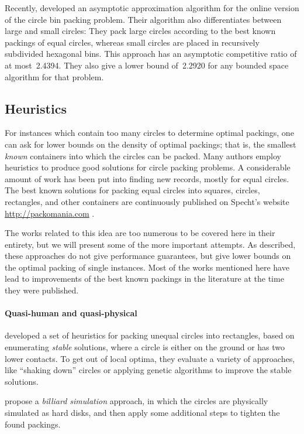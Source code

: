 \documentclass[a4paper,style=print,bibliography=totoc,nexus,lnum,extramargin]{tubsbook}
\begin{document}
Recently, \textcite{HMS2016bounded} developed an asymptotic approximation algorithm for the online version of the circle bin packing problem.
Their algorithm also differentiates between large and small circles: They pack large circles according to the best known packings of equal circles, whereas small circles are placed in recursively subdivided hexagonal bins. This approach has an asymptotic competitive ratio of at most~2.4394. They also give a lower bound of~2.2920 for any bounded space algorithm for that problem.

\subsection{Heuristics}

For instances which contain too many circles to determine optimal packings, one can ask for lower bounds on the density of optimal packings; that is, the smallest \emph{known} containers into which the circles can be packed.
Many authors employ heuristics to produce good solutions for circle packing problems.
A considerable amount of work has been put into finding new records, mostly for equal circles. The best known solutions for packing equal circles into squares, circles, rectangles, and other containers are continuously published on Specht's website \url{http://packomania.com} \cite{specht2015packomania}.

The works related to this idea are too numerous to be covered here in their entirety, but we will present some of the more important attempts. As described, these approaches do not give performance guarantees, but give lower bounds on the optimal packing of single instances. Most of the works mentioned here have lead to improvements of the best known packings in the literature at the time they were published.

\paragraph{Quasi-human and quasi-physical}

\textcite{GGL1995packing} developed a set of heuristics for packing unequal circles into rectangles, based on enumerating \emph{stable} solutions, where a circle is either on the ground or has two lower contacts. To get out of local optima, they evaluate a variety of approaches, like “shaking down” circles or applying genetic algorithms to improve the stable solutions.

\textcite{GLNO1998dense} propose a \emph{billiard simulation} approach, in which the circles are physically simulated as hard disks, and then apply some additional steps to tighten the found packings.
\end{document}

